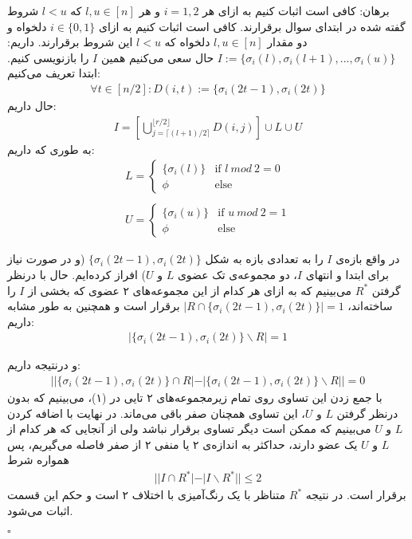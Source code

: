 \documentclass[a4paper,12pt]{article}
\begin{document}
برهان:
کافی است اثبات کنیم به ازای هر
$i = 1 , 2$
و هر
$l, u \in [n]$
که
$l < u$
شروط گفته شده در ابتدای سوال برقرارند.
کافی است اثبات کنیم به ازای $i \in \{0,1\}$ دلخواه و دو مقدار
$l , u \in [n]$
دلخواه که
$l < u$
این شروط برقرارند.
داریم:
$I := \{\sigma_i(l), \sigma_i(l+1), ..., \sigma_i(u) \}$
حال سعی می‌کنیم همین $I$ را بازنویسی کنیم. ابتدا تعریف می‌کنیم:
\begin{align*}
\forall t \in [n/2] : D(i, t) := \{\sigma_i(2t-1), \sigma_i(2t) \}	
\end{align*}
حال داریم:
\begin{align}
	I = [\bigcup_{j=\lceil (l+1)/2 \rceil}^{\lfloor r/2 \rfloor} D(i,j)] \cup L \cup U
\end{align}
به طوری که داریم:
\begin{align*}
	L =
\left\{
	\begin{array}{ll}
		\{\sigma_i (l)\}  & \mbox{if } l \ mod \ 2 = 0\\
		\phi & \mbox{else }
	\end{array}
\right. \\ \\
	U =
\left\{
	\begin{array}{ll}
		\{\sigma_i (u)\}  & \mbox{if } u \ mod \ 2 = 1\\
		\phi & \mbox{else }
	\end{array}
\right.
\end{align*}

در واقع بازه‌ی $I$ را به تعدادی بازه‌ به شکل
$\{\sigma_i(2t-1), \sigma_i(2t) \}$
(و در صورت نیاز برای ابتدا و انتهای $I$، دو مجموعه‌ی تک عضوی $L$ و $U$) افراز کرده‌ایم. حال  با درنظر گرفتن $R^*$ می‌بینیم که به ازای هر کدام از این مجموعه‌های ۲ عضوی که بخشی از $I$ را ساخته‌اند، 
$|R \cap \{\sigma_i(2t-1), \sigma_i(2t) \}| = 1$
برقرار است و همچنین به طور مشابه داریم:
\begin{align*}
|\{\sigma_i(2t-1), \sigma_i(2t) \} \backslash R| = 1	
\end{align*}

و درنتیجه داریم:
\begin{align*}
	||\{\sigma_i(2t-1), \sigma_i(2t) \} \cap R| - |\{\sigma_i(2t-1), \sigma_i(2t) \} \backslash R|| = 0
\end{align*}
با جمع زدن این تساوی روی تمام زیرمجموعه‌های ۲ تایی در (۱)، می‌بینیم که بدون درنظر گرفتن $L$ و $U$، این تساوی همچنان صفر باقی می‌ماند. در نهایت با اضافه کردن $L$ و $U$ می‌بینیم که ممکن است دیگر تساوی برقرار نباشد ولی از آنجایی که هر کدام از $L$ و $U$ یک عضو دارند، حداکثر به اندازه‌ی ۲ یا منفی ۲ از صفر فاصله می‌گیریم، پس همواره شرط
\begin{align*}
	||I \cap R^*| - |I \backslash R^*|| \leq 2
\end{align*}
برقرار است. در نتیجه $R^*$ متناظر با یک رنگ‌آمیزی با اختلاف ۲ است و حکم این قسمت اثبات می‌شود.
\begin{latin}
	$\square$
\end{latin}
\end{document}
